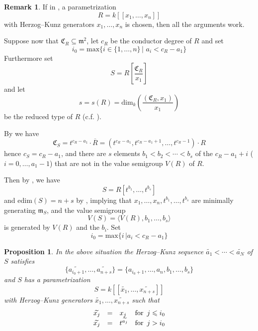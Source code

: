 \documentclass[12pt]{amsart}
\theoremstyle{plain}%
\newtheorem{proposition}[satz]{Proposition}
\theoremstyle{definition}
\newtheorem{notiz}{Remark}[section]
\renewcommand{\(}{\left(}
\renewcommand{\)}{\right)}
\renewcommand{\leq}{\leqslant}
\begin{document}
\begin{notiz}
If in \cite[Theorem 4.2]{MM},  a parametrization 
	$$ R = k[[x_1, \ldots, x_n]] $$
with Herzog--Kunz generators $x_1, \ldots, x_n$ is chosen, 
then all the arguments work.
\end{notiz}

\bigbreak

Suppose now that $\mathfrak C_R \subseteq \mathfrak m^2$, 
let $c_R$ be the conductor degree of $R$ and set 
	$$ i_0 = \mathrm{max}\{i \in \{1, \ldots, n\}\,\vert \,
    \, a_i < c_R-a_1 \} $$
Furthermore set 
	$$ S = R[ \frac {\mathfrak C_R}{x_1}] $$
and let 
	$$ s = s(R) = 
	\mathrm{dim}_k \left( \frac {\left(\mathfrak C_R, 
    x_1\right)}{x_1} \right) $$ 
be the reduced type of $R$ \cite[\S 4]{HMM} (c.f. \cite{maitra2023extremal}). 

By \cite[(4.2)]{HMM} we have 
	$$ \mathfrak C_S = t^{c_R-a_1} \cdot \overline{R} = 
	\left(t^{c_R-a_1}, t^{c_R-a_1+1}, \ldots , t^{c_R-1} 
    \right) \cdot R $$
hence $c_S = c_R-a_1$, and there are $s$ elements  
$b_1 < b_2 < \cdots < b_s$ of the $c_R - a_1+i$ 
($i = 0,\ldots, a_1-1$) that are not in the 
value semigroup $V(R)$ of $R$. 

Then by \cite[\S 4]{HMM},  we have 
	$$ S = R[t^{b_1}, \ldots , t^{b_s}] $$
and $\mathrm{edim}(S) = n+s$ by \cite[Theorem 4.6]{HMM},  
implying that $x_1, \ldots, x_n, t^{b_1}, \ldots , t^{b_s}$
are minimally generating $\mathfrak m_S$, and the value 
semigroup 
	$$ V(S) = \langle V(R), b_1, \ldots, b_s \rangle $$
is generated by $V(R)$ and the $b_i$. Set 
	$$ i_0 = \mathrm{max}\{ i \, \vert a_i < c_R -a_1\} $$

\begin{proposition}\label{prop:MM_4_4_1}
In the above situation the Herzog--Kunz sequence 
$\widetilde{a_1} < \cdots < \widetilde{a_N}$ of $S$ 
satisfies 
	$$ \{\widetilde{a_{i_0+1}},\ldots,\widetilde{a_{n+s}}\} 
    = \{a_{i_0+1}, \ldots, a_{n}, b_1,\ldots, b_s \} $$
and $S$ has a parametrization 
	$$ S = k[[\widetilde{x_1},\ldots,\widetilde{x_{n+s}}]] $$
with Herzog--Kunz generators $\widetilde{x_1},\ldots,
\widetilde{x_{n+s}}$  such that 
	$$ \begin{array} {l c l l}
	\widetilde{x_j} & = & x_j & \text{for }\, j \leq i_0 \\
	\widetilde{x_j} & = & t^{\widetilde{a_j}} & \text{for } 
    \, j > i_0 \\
	\end{array} $$  
\end{proposition}
\end{document}
